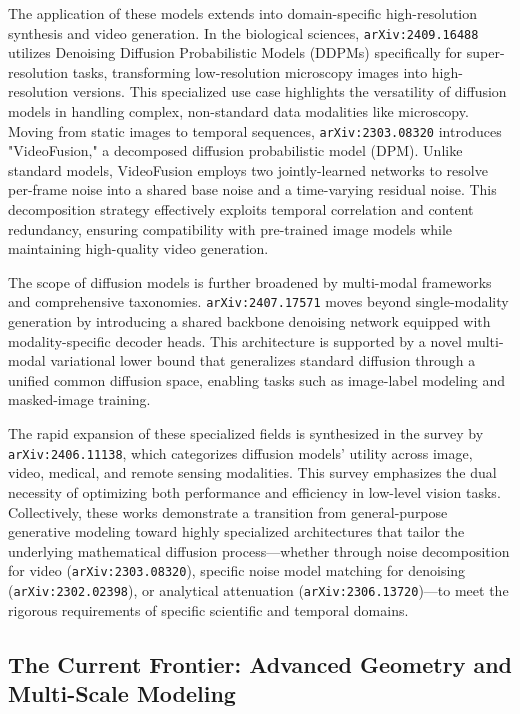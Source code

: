 \documentclass[11pt]{article}
\begin{document}
The application of these models extends into domain-specific high-resolution synthesis and video generation. In the biological sciences, \texttt{arXiv:2409.16488} utilizes Denoising Diffusion Probabilistic Models (DDPMs) specifically for super-resolution tasks, transforming low-resolution microscopy images into high-resolution versions. This specialized use case highlights the versatility of diffusion models in handling complex, non-standard data modalities like microscopy. Moving from static images to temporal sequences, \texttt{arXiv:2303.08320} introduces "VideoFusion," a decomposed diffusion probabilistic model (DPM). Unlike standard models, VideoFusion employs two jointly-learned networks to resolve per-frame noise into a shared base noise and a time-varying residual noise. This decomposition strategy effectively exploits temporal correlation and content redundancy, ensuring compatibility with pre-trained image models while maintaining high-quality video generation.

The scope of diffusion models is further broadened by multi-modal frameworks and comprehensive taxonomies. \texttt{arXiv:2407.17571} moves beyond single-modality generation by introducing a shared backbone denoising network equipped with modality-specific decoder heads. This architecture is supported by a novel multi-modal variational lower bound that generalizes standard diffusion through a unified common diffusion space, enabling tasks such as image-label modeling and masked-image training.

The rapid expansion of these specialized fields is synthesized in the survey by \texttt{arXiv:2406.11138}, which categorizes diffusion models' utility across image, video, medical, and remote sensing modalities. This survey emphasizes the dual necessity of optimizing both performance and efficiency in low-level vision tasks. Collectively, these works demonstrate a transition from general-purpose generative modeling toward highly specialized architectures that tailor the underlying mathematical diffusion process—whether through noise decomposition for video (\texttt{arXiv:2303.08320}), specific noise model matching for denoising (\texttt{arXiv:2302.02398}), or analytical attenuation (\texttt{arXiv:2306.13720})—to meet the rigorous requirements of specific scientific and temporal domains.

\subsection{The Current Frontier: Advanced Geometry and Multi-Scale Modeling}
\end{document}
